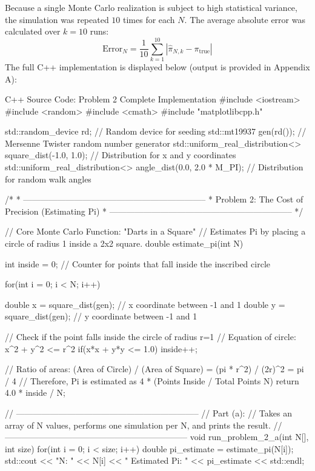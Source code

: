 \documentclass{article}
\begin{document}
Because a single Monte Carlo realization is subject to high statistical variance, the simulation was repeated $10$ times for each $N$. The average absolute error was calculated over $k=10$ runs:
\begin{equation}
    \text{Error}_N = \frac{1}{10} \sum_{k=1}^{10} |\hat{\pi}_{N,k} - \pi_{\text{true}}|
\end{equation}
The full C++ implementation is displayed below (output is provided in Appendix A):
\newpage
\begin{codebox}{C++ Source Code: Problem 2 Complete Implementation}
#include <iostream>
#include <random>
#include <cmath> 
#include "matplotlibcpp.h"

std::random_device rd; // Random device for seeding
std::mt19937 gen(rd()); // Mersenne Twister random number generator
std::uniform_real_distribution<> square_dist(-1.0, 1.0); // Distribution for x and y coordinates
std::uniform_real_distribution<> angle_dist(0.0, 2.0 * M_PI); // Distribution for random walk angles

/* 
 * -----------------------------------------------------------------
 * Problem 2: The Cost of Precision (Estimating Pi)
 * -----------------------------------------------------------------
 */

// Core Monte Carlo Function: "Darts in a Square"
// Estimates Pi by placing a circle of radius 1 inside a 2x2 square.
double estimate_pi(int N){
    
   

    int inside = 0; // Counter for points that fall inside the inscribed circle

    for(int i = 0; i < N; i++){
        double x = square_dist(gen); // x coordinate between -1 and 1
        double y = square_dist(gen); // y coordinate between -1 and 1

        // Check if the point falls inside the circle of radius r=1
        // Equation of circle: x^2 + y^2 <= r^2
        if(x*x + y*y <= 1.0){
            inside++;
        }
    }

    // Ratio of areas: (Area of Circle) / (Area of Square) = (pi * r^2) / (2r)^2 = pi / 4
    // Therefore, Pi is estimated as 4 * (Points Inside / Total Points N)
    return 4.0 * inside / N;
}


// -----------------------------------------------------------------
// Part (a): 
// Takes an array of N values, performs one simulation per N, and prints the result.
// -----------------------------------------------------------------
void run_problem_2_a(int N[], int size){
    for(int i = 0; i < size; i++){
        double pi_estimate = estimate_pi(N[i]);
        std::cout << "N: " << N[i] << " Estimated Pi: " << pi_estimate << std::endl;
    }
}



\end{codebox}
\end{document}
